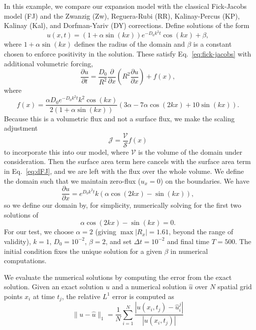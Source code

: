 \documentclass[11pt]{article}
\begin{document}
In this example, we compare our expansion model with the classical Fick-Jacobs model (FJ) and the Zwanzig (Zw), Reguera-Rubi (RR), Kalinay-Percus (KP), Kalinay (Kal), and Dorfman-Yariv (DY) corrections. Define solutions of the form
\begin{equation}
    u(x,t) = (1 + \alpha \sin(kx)) e^{-D_0k^2t}\cos(kx) + \beta,
\end{equation}
where $1 + \alpha \sin(kx)$ defines the radius of the domain and $\beta$ is a constant chosen to enforce positivity in the solution. These satisfy Eq.~\eqref{eq:fick-jacobs} with additional volumetric forcing,
\begin{equation}
    \frac{\partial u}{\partial t} = \frac{D_0}{R^2} \frac{\partial}{\partial x} \left( R^2 \frac{\partial u}{\partial x} \right) + f(x),
\end{equation}
where
\begin{equation}
    f(x) = \frac{\alpha D_0 e^{-D_0 k^2 t} k^2 \cos(kx)}{2(1 + \alpha \sin(kx))}(3\alpha - 7\alpha \cos(2kx) + 10\sin(kx)).
\end{equation}
Because this is a volumetric flux and not a surface flux, we make the scaling adjustment
\begin{equation}
    \mathcal{J} = \frac{\mathcal{V}}{\mathcal{S}} f(x)
\end{equation}
to incorporate this into our model, where $\mathcal{V}$ is the volume of the domain under consideration. Then the surface area term here cancels with the surface area term in Eq.~\eqref{eq:dFJ}, and we are left with the flux over the whole volume. We define the domain such that we maintain zero-flux ($u_x = 0$) on the boundaries. We have
\begin{equation}
    \frac{\partial u}{\partial x} = e^{D_0k^2t}k(\alpha \cos(2kx) - \sin(kx)),
\end{equation}
so we define our domain by, for simplicity, numerically solving for the first two solutions of
\begin{equation}
    \alpha \cos(2kx) - \sin(kx) = 0.
\end{equation}
For our test, we choose $\alpha = 2$ (giving $\max |R_x| = 1.61$, beyond the range of validity), $k = 1$, $D_0 = 10^{-2}$, $\beta = 2$, and set $\Delta t = 10^{-2}$ and final time $T = 500$. The initial condition fixes the unique solution for a given $\beta$ in numerical computations.

We evaluate the numerical solutions by computing the error from the exact solution. Given an exact solution $u$ and a numerical solution $\widehat{u}$ over $N$ spatial grid points $x_i$ at time $t_j$, the relative $L^1$ error is computed as
\begin{equation}
    \|u - \widehat{u} \|_1 = \frac{1}{N} \sum_{i = 1}^N \frac{| u(x_i, t_j) - \widehat{u}_i^j |}{| u(x_i, t_j) |}
\end{equation}
\end{document}
